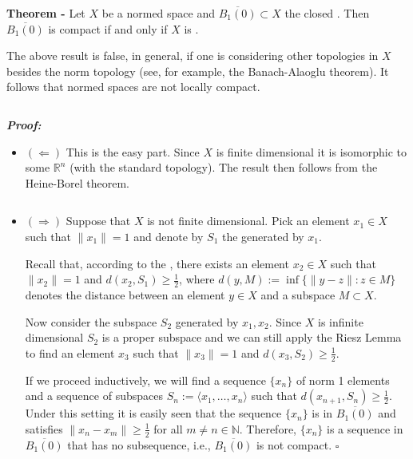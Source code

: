 \documentclass[12pt]{article}
\begin{document}

{\bf Theorem -} Let $X$ be a normed space and $\overline{B_1(0)} \subset X$ the closed  . Then $\overline{B_1(0)}$ is compact if and only if $X$ is .

The above result is false, in general, if one is considering other topologies in $X$ besides the norm topology (see, for example, the Banach-Alaoglu theorem). It follows that  normed spaces are not locally compact.

$\,$

{\bf \emph{Proof:}}
\begin{itemize}
\item $(\Longleftarrow)$ This is the easy part. Since $X$ is finite dimensional it is isomorphic to some $\mathbb{R}^n$ (with the standard topology). The result then follows from the Heine-Borel theorem.

$\,$

\item $(\Longrightarrow)$ Suppose that $X$ is not finite dimensional. Pick an element $x_1 \in X$ such that $\|x_1\|=1$ and denote by $S_1$ the  generated by $x_1.$

Recall that, according to the , there exists an element $x_2 \in X$ such that $\|x_2\|=1$ and $d(x_2,S_1)\geq \frac{1}{2}$, where $d(y, M):= \inf\{\|y-z\|: z\in M\}$ denotes the distance between an element $y\in X$ and a subspace $M\subset X.$

Now consider the subspace $S_2$ generated by $x_1, x_2$. Since $X$ is infinite dimensional $S_2$ is a proper subspace and we can still apply the Riesz Lemma to find an element $x_3$ such that $\|x_3\|=1$ and $d(x_3,S_2)\geq \frac{1}{2}.$

If we proceed inductively, we will find a sequence $\{x_n\}$ of norm 1 elements and a sequence of subspaces $S_n:=\langle x_1, \dots, x_n\rangle$ such that $d(x_{n+1}, S_n)\geq\frac{1}{2}.$ Under this setting it is easily seen that the sequence $\{x_n\}$ is in $\overline{B_1(0)}$ and satisfies $\|x_n - x_m\|\geq\frac{1}{2}$ for all $m \neq n \in \mathbb{N}$. Therefore, $\{x_n\}$ is a sequence in $\overline{B_1(0)}$ that has no  subsequence, i.e., $\overline{B_1(0)}$ is not compact. $\square$
\end{itemize}
\end{document}
